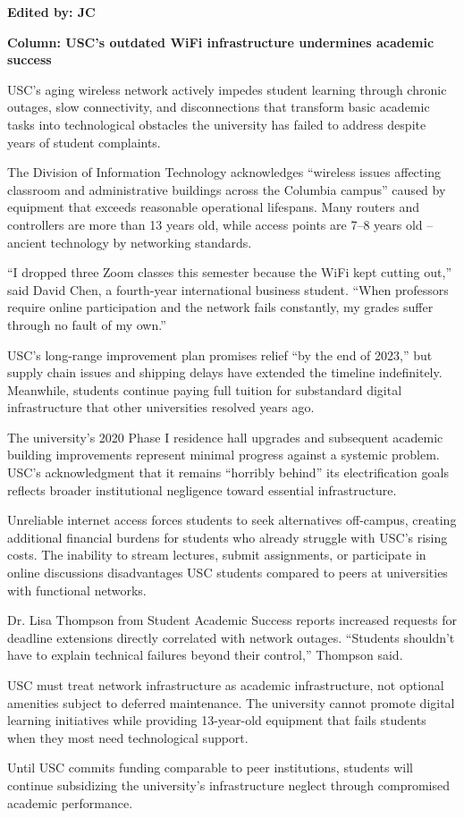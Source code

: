 \documentclass[12pt]{article}
\begin{document}
\begin{newversion}
\textbf{Edited by: JC}

\textbf{Column: USC's outdated WiFi infrastructure undermines academic success}

USC's aging wireless network actively impedes student learning through chronic outages, slow connectivity, and disconnections that transform basic academic tasks into technological obstacles the university has failed to address despite years of student complaints.

The Division of Information Technology acknowledges ``wireless issues affecting classroom and administrative buildings across the Columbia campus'' caused by equipment that exceeds reasonable operational lifespans. Many routers and controllers are more than 13 years old, while access points are 7–8 years old – ancient technology by networking standards.

``I dropped three Zoom classes this semester because the WiFi kept cutting out,'' said David Chen, a fourth-year international business student. ``When professors require online participation and the network fails constantly, my grades suffer through no fault of my own.''

USC's long-range improvement plan promises relief ``by the end of 2023,'' but supply chain issues and shipping delays have extended the timeline indefinitely. Meanwhile, students continue paying full tuition for substandard digital infrastructure that other universities resolved years ago.

The university's 2020 Phase I residence hall upgrades and subsequent academic building improvements represent minimal progress against a systemic problem. USC's acknowledgment that it remains ``horribly behind'' its electrification goals reflects broader institutional negligence toward essential infrastructure.

Unreliable internet access forces students to seek alternatives off-campus, creating additional financial burdens for students who already struggle with USC's rising costs. The inability to stream lectures, submit assignments, or participate in online discussions disadvantages USC students compared to peers at universities with functional networks.

Dr. Lisa Thompson from Student Academic Success reports increased requests for deadline extensions directly correlated with network outages. ``Students shouldn't have to explain technical failures beyond their control,'' Thompson said.

USC must treat network infrastructure as academic infrastructure, not optional amenities subject to deferred maintenance. The university cannot promote digital learning initiatives while providing 13-year-old equipment that fails students when they most need technological support.

Until USC commits funding comparable to peer institutions, students will continue subsidizing the university's infrastructure neglect through compromised academic performance.
\end{newversion}
\end{document}

